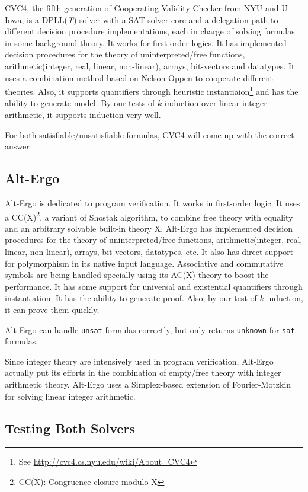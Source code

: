 \documentclass[10pt,letter]{article}
\theoremstyle{definition}
\begin{document}
CVC4, the fifth generation of Cooperating Validity Checker from NYU and U Iowa, is a DPLL({\it T}) solver with a SAT solver core and a delegation path to different decision procedure implementations, each in charge of solving formulas in some background theory\cite{barrett:cvc4:2011}. It works for first-order logics. It has implemented decision procedures for the theory of uninterpreted/free functions, arithmetic(integer, real, linear, non-linear), arrays, bit-vectors and datatypes. It uses a combination method based on Nelson-Oppen to cooperate different theories. Also, it supports quantifiers through heuristic instantiaion\footnote{See \url{http://cvc4.cs.nyu.edu/wiki/About_CVC4}} and has the ability to generate model. By our tests of $k$-induction over linear integer arithmetic, it supports induction very well.

For both satisfiable/unsatisfiable formulas, CVC4 will come up with the correct answer

\subsection{Alt-Ergo}

Alt-Ergo is dedicated to program verification. It works in first-order logic. It uses a CC(X)\footnote{CC(X): Congruence closure modulo X}, a variant of Shostak algorithm, to combine free theory with equality and an arbitrary solvable built-in theory X\cite{conchonHDR2012}. Alt-Ergo has implemented decision procedures for the theory of uninterpreted/free functions, arithmetic(integer, real, linear, non-linear), arrays, bit-vectors, datatypes, etc. It also has direct support for polymorphism in its native input language. Associative and commutative symbols are being handled specially using its AC(X) theory to boost the performance. It has some support for universal and existential quantifiers through instantiation. It has the ability to generate proof. Also, by our test of $k$-induction, it can prove them quickly.

Alt-Ergo can handle {\tt unsat} formulas correctly, but only returns {\tt unknown} for {\tt sat} formulas.

Since integer theory are intensively used in program verification, Alt-Ergo actually put its efforts in the combination of empty/free theory with integer arithmetic theory. Alt-Ergo uses a Simplex-based extension of Fourier-Motzkin for solving linear integer arithmetic\cite{bobot:hal-00687640}.

\subsection{Testing Both Solvers}
\end{document}
